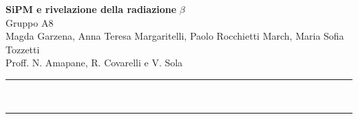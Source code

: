 \documentclass[a4paper,12pt]{article}
\renewenvironment{abstract}
 {\par\noindent\textbf{\abstractname}\ \ignorespaces \\}
 {\par\noindent\medskip}
\begin{document}
\pagestyle{fancy}
\thispagestyle{fancy}
\begin{center}
    \Large{\textbf{SiPM e rivelazione della radiazione }$\beta$ }
\vspace{0.4cm}
\normalsize
\\ Gruppo A8 \\Magda Garzena, Anna Teresa Margaritelli, Paolo Rocchietti March, Maria Sofia Tozzetti\\
\small Proff. N. Amapane, R. Covarelli e V. Sola

\vspace{0.5cm}
\medskip
\normalsize
\end{center}
{\color{gray}\hrule}
\vspace{0.4cm}
\begin{abstract}

\end{abstract}
{\color{gray}\hrule}
\medskip
\tableofcontents
\newpage





%
%
\end{document}
